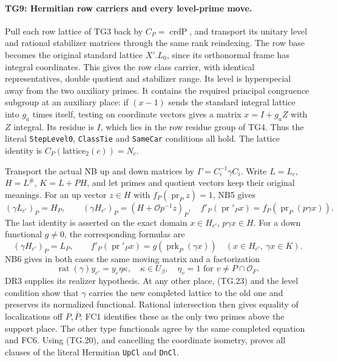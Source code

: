 \documentclass[11pt,a4paper]{article}
\numberwithin{equation}{section}
\theoremstyle{remark}\newtheorem{remark}[theorem]{Remark}
\begin{document}
\paragraph{TG9: Hermitian row carriers and every level-prime move.}
Pull each row lattice of TG3 back by $C_P=\operatorname{crdP}$,
and transport its unitary level and rational stabilizer matrices
through the same rank reindexing. The row base becomes the
original standard lattice $X'.L_0$, since its orthonormal frame
has integral coordinates. This gives the row class carrier,
with identical representatives, double quotient and stabilizer
range. Its level is hyperspecial away from the two auxiliary
primes. It contains the required principal congruence subgroup
at an auxiliary place: if $(x-1)$ sends the standard integral
lattice into $g_a$ times itself, testing on coordinate vectors
gives a matrix $x=I+g_a Z$ with $Z$ integral. Its residue is
$I$, which lies in the row residue group of TG4. Thus the
literal \texttt{StepLevel0}, \texttt{ClassTie} and
\texttt{SameCar} conditions all hold. The lattice identity is
$C_P(\mathrm{lattice}_2(c))=N_c$.

Transport the actual NB up and down matrices by
$\Gamma=C_i^{-1}\gamma C_i$. Write $L=L_c$, $H=L^{\#}$,
$K=L+PH$, and let primes and quotient vectors keep their
original meanings. For an up vector $z\in H$ with
$f_P(\operatorname{pr}_Pz)=1$, NB5 gives
\[
 (\gamma L_{c'})_P=H_P,\qquad
 (\gamma H_{c'})_P=(H+\mathcal O p^{-1}z)_P,
 \quad f'_{P}(\operatorname{pr}'_P x)
      =f_P(\operatorname{pr}_P(p\gamma x)).
 \tag{TG.21}
\]
The last identity is asserted on the exact domain
$x\in H_{c'}$, $p\gamma x\in H$. For a down functional
$g\ne0$, the corresponding formulas are
\[
 (\gamma H_{c'})_P=L_P,\qquad
 f'_{P}(\operatorname{pr}'_P x)
             =g(\operatorname{prk}_P(\gamma x))
       \quad(x\in H_{c'},\ \gamma x\in K).
 \tag{TG.22}
\]
NB6 gives in both cases the same moving matrix and a factorization
\[
       \operatorname{rat}(\gamma)y_{c'}=y_c\eta\kappa,
       \quad\kappa\in U_\beta,
       \quad\eta_v=1\text{ for }v\ne P\cap\mathcal O_F.
 \tag{TG.23}
\]
DR3 supplies its realizer hypothesis. At any other place,
(TG.23) and the level condition show that $\gamma$ carries the
new completed lattice to the old one and preserves its
normalized functional. Rational intersection then gives equality
of localizations off $P,\bar P$; FC1 identifies these as the
only two primes above the support place. The other type
functionals agree by the same completed equation and FC6.
Using (TG.20), and cancelling the coordinate isometry, proves
all clauses of the literal Hermitian \texttt{UpCl} and
\texttt{DnCl}.
\end{document}
